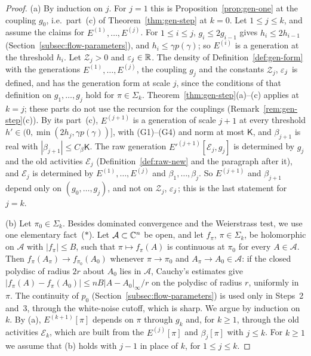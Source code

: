 \begin{proof}
(a) By induction on $j$. For $j=1$ this is Proposition~\ref{prop:gen-one} at the coupling $g_0$, i.e.\ part~(c) of Theorem~\ref{thm:gen-step} at $k=0$. Let $1\le j\le k$, and assume the claims for $E^{(1)},\dots,E^{(j)}$. For $1\le i\le j$, $g_i\le2g_{i-1}$ gives $h_i\le2h_{i-1}$ (Section~\ref{subsec:flow-parameters}), and $h_i\le\gamma p(\gamma)$; so $E^{(i)}$ is a generation at the threshold $h_i$. Let $\mathcal Z_j>0$ and $\varepsilon_j\in\mathbb R$. The density of Definition~\ref{def:gen-form} with the generations $E^{(1)},\dots,E^{(j)}$, the coupling $g_j$ and the constants $\mathcal Z_j$, $\varepsilon_j$ is defined, and has the generation form at scale $j$, since the conditions of that definition on $g_1,\dots,g_j$ hold for $\pi\in\Sigma_k$. Theorem~\ref{thm:gen-step}(a)--(c) applies at $k=j$; these parts do not use the recursion for the couplings (Remark~\ref{rem:gen-step}(c)). By its part~(c), $E^{(j+1)}$ is a generation of scale $j+1$ at every threshold $h'\in(0,\min(2h_j,\gamma p(\gamma))]$, with (G1)--(G4) and norm at most $\mathsf K$, and $\beta_{j+1}$ is real with $|\beta_{j+1}|\le C_\beta\mathsf K$. The raw generation $E'^{(j+1)}[\mathcal E_j,g_j]$ is determined by $g_j$ and the old activities $\mathcal E_j$ (Definition~\ref{def:raw-new} and the paragraph after it), and $\mathcal E_j$ is determined by $E^{(1)},\dots,E^{(j)}$ and $\beta_1,\dots,\beta_j$. So $E^{(j+1)}$ and $\beta_{j+1}$ depend only on $(g_0,\dots,g_j)$, and not on $\mathcal Z_j$, $\varepsilon_j$; this is the last statement for $j=k$.

(b) Let $\pi_0\in\Sigma_k$. Besides dominated convergence and the Weierstrass test, we use one elementary fact~($*$). Let $\mathcal A\subset\mathbb C^n$ be open, and let $f_\pi$, $\pi\in\Sigma_k$, be holomorphic on $\mathcal A$ with $|f_\pi|\le B$, such that $\pi\mapsto f_\pi(A)$ is continuous at $\pi_0$ for every $A\in\mathcal A$. Then $f_\pi(A_\pi)\to f_{\pi_0}(A_0)$ whenever $\pi\to\pi_0$ and $A_\pi\to A_0\in\mathcal A$: if the closed polydisc of radius $2r$ about $A_0$ lies in $\mathcal A$, Cauchy's estimates give $|f_\pi(A)-f_\pi(A_0)|\le nB|A-A_0|_\infty/r$ on the polydisc of radius $r$, uniformly in $\pi$. The continuity of $p_0$ (Section~\ref{subsec:flow-parameters}) is used only in Steps~2 and~3, through the white-noise cutoff, which is sharp. We argue by induction on $k$. By (a), $E^{(k+1)}[\pi]$ depends on $\pi$ through $g_k$ and, for $k\ge1$, through the old activities $\mathcal E_k$, which are built from the $E^{(j)}[\pi]$ and $\beta_j[\pi]$ with $j\le k$. For $k\ge1$ we assume that (b) holds with $j-1$ in place of $k$, for $1\le j\le k$.


\end{proof}
